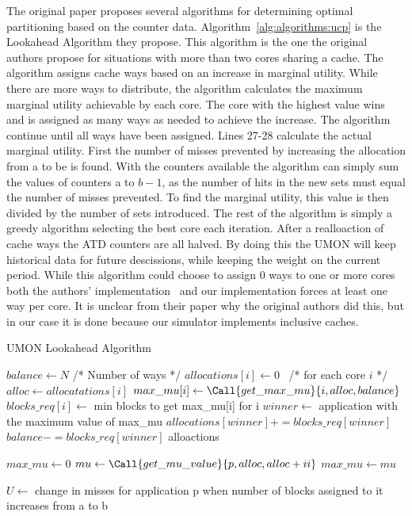 The original paper proposes several algorithms for determining optimal partitioning based on the counter data. 
Algorithm~\ref{alg:algorithms:ucp} is the Lookahead Algorithm they propose.
This algorithm is the one the original authors propose for situations with more than two cores sharing a cache.
The algorithm assigns cache ways based on an increase in marginal utility.
While there are more ways to distribute, the algorithm calculates the maximum marginal utility achievable by each core. 
The core with the highest value wins and is assigned as many ways as needed to achieve the increase.
The algorithm continue until all ways have been assigned.
Lines 27-28 calculate the actual marginal utility. 
First the number of misses prevented by increasing the allocation from a to be is found.
With the counters available the algorithm can simply sum the values of counters a to $b-1$, as the number of hits in the new sets must equal the number of misses prevented.
To find the marginal utility, this value is then divided by the number of sets introduced.
The rest of the algorithm is simply a greedy algorithm selecting the best core each iteration.
After a realloaction of cache ways the ATD counters are all halved.
By doing this the UMON will keep historical data for future descissions, while keeping the weight on the current period.
While this algorithm could choose to assign 0 ways to one or more cores both the authors' implementation~\cite{Qureshi2006} and our implementation forces at least one way per core.
It is unclear from their paper why the original authors did this, but in our case it is done because our simulator implements inclusive caches.

\begin{algorithm}[ht]
\caption{UMON Lookahead Algorithm}
\label{alg:algorithms:ucp}
\begin{algorithmic}[1]
\State $balance\gets N$ /* Number of ways */
\State $allocations[i]\gets 0$  /* for each core $i$ */
        \State $alloc\gets allocatations[i]$
        \State $max\_mu[i]\gets \Call{get\_max\_mu}{i, alloc, balance}$
        \State $blocks\_req[i]\gets$ min blocks to get max\_mu[i] for i
    \EndFor
    \State $winner\gets$ application with the maximum value of max\_mu
    \State $allocations[winner] += blocks\_req[winner]$
    \State $balance -= blocks\_req[winner]$
\EndWhile
\State \Return alloactions
\State

    \State $max\_mu\gets 0$
        \State $mu\gets \Call{get\_mu\_value}{p, alloc, alloc+ii}$
            \State $max\_mu\gets mu$
        \EndIf
    \EndFor
    \State {}
\EndFunction
\State

    \State $U\gets$ change in misses for application p when number of blocks assigned to it increases from a to b
    \State {}
\EndFunction
\end{algorithmic}
\end{algorithm}

